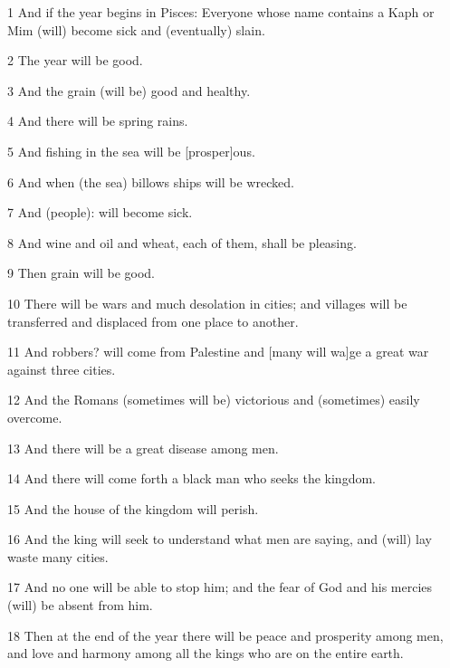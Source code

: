 \par 1 And if the year begins in Pisces: Everyone whose name contains a Kaph or Mim (will) become sick and (eventually) slain. 

\par 2 The year will be good. 

\par 3 And the grain (will be) good and healthy. 

\par 4 And there will be spring rains. 

\par 5 And fishing in the sea will be [prosper]ous.

\par 6 And when (the sea) billows ships will be wrecked. 

\par 7 And (people): will become sick. 

\par 8 And wine and oil and wheat, each of them, shall be pleasing. 

\par 9 Then grain will be good. 

\par 10 There will be wars and much desolation in cities; and villages will be transferred and displaced from one place to another.

\par 11 And robbers? will come from Palestine and [many will wa]ge a great war against three cities. 

\par 12 And the Romans (sometimes will be) victorious and (sometimes) easily overcome. 

\par 13 And there will be a great disease among men. 

\par 14 And there will come forth a black man who seeks the kingdom. 

\par 15 And the house of the kingdom will perish. 

\par 16 And the king will seek to understand what men are saying, and (will) lay waste many cities. 

\par 17 And no one will be able to stop him; and the fear of God and his mercies (will) be absent from him. 

\par 18 Then at the end of the year there will be peace and prosperity among men, and love and harmony among all the kings who are on the entire earth.

